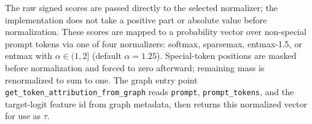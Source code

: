 \documentclass[../main.tex]{subfiles}
\begin{document}
The raw signed scores are passed directly to the selected normalizer; the implementation
does not take a positive part or absolute value before normalization. These scores are
mapped to a probability vector over non-special prompt tokens via one of four normalizers:
softmax, sparsemax, entmax-1.5, or entmax with
$\alpha \in (1, 2]$ (default $\alpha = 1.25$). Special-token positions are masked
before normalization and forced to zero afterward; remaining mass is renormalized
to sum to one. The graph entry point
\texttt{get\_token\_attribution\_from\_graph} reads \texttt{prompt},
\texttt{prompt\_tokens}, and the target-logit feature id from graph metadata, then
returns this normalized vector for use as $\tau$.







\end{document}
